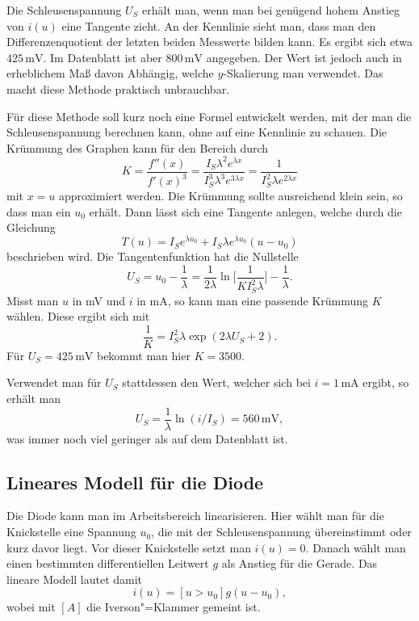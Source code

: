 \documentclass[a4paper,10pt,fleqn,twocolumn,twoside]{scrartcl}
\numberwithin{equation}{section}
\begin{document}
Die Schleusenspannung $U_S$ erhält man,
wenn man bei genügend hohem Anstieg von $i(u)$ eine Tangente
zieht. An der Kennlinie sieht man, dass man den Differenzenquotient
der letzten beiden Messwerte bilden kann. Es ergibt sich etwa
$425\,\mathrm{mV}$. Im Datenblatt ist aber $800\,\mathrm{mV}$
angegeben. Der Wert ist jedoch auch in erheblichem
Maß davon Abhängig, welche $y$-Skalierung man verwendet.
Das macht diese Methode praktisch unbrauchbar.

Für diese Methode soll kurz noch eine Formel entwickelt werden,
mit der man die Schleusenspannung berechnen kann, ohne
auf eine Kennlinie zu schauen. Die Krümmung des Graphen kann für den
Bereich durch%
\begin{equation}
K = \frac{f''(x)}{f'(x)^3}
= \frac{I_S\lambda^2 e^{\lambda x}}{I_S^3\lambda^3 e^{3\lambda x}}
= \frac{1}{I_S^2\lambda e^{2\lambda x}}
\end{equation}
mit $x=u$ approximiert werden. Die Krümmung sollte ausreichend
klein sein, so dass man ein $u_0$ erhält.
Dann lässt sich eine Tangente anlegen, welche
durch die Gleichung%
\begin{equation}
T(u) = I_S e^{\lambda u_0}+I_S \lambda e^{\lambda u_0}(u-u_0)
\end{equation}
beschrieben wird. Die Tangentenfunktion hat die Nullstelle%
\begin{equation}
U_S = u_0-\frac{1}{\lambda} = \frac{1}{2\lambda}
\ln\bigg[\frac{1}{KI_S^2\lambda}\bigg]-\frac{1}{\lambda}.
\end{equation}
Misst man $u$ in mV und $i$ in mA, so kann man eine passende
Krümmung $K$ wählen. Diese ergibt sich mit%
\begin{equation}
\frac{1}{K} = I_S^2\lambda\exp(2\lambda U_S+2).
\end{equation}
Für $U_S=425\,\mathrm{mV}$ bekommt man hier $K=3500$.

Verwendet man für $U_S$ stattdessen den Wert, welcher sich
bei $i=1\,\mathrm{mA}$ ergibt, so erhält man%
\begin{equation}
U_S = \frac{1}{\lambda}\ln(i/I_S) = 560\,\mathrm{mV},
\end{equation}
was immer noch viel geringer als auf dem Datenblatt ist.

\subsection{Lineares Modell für die Diode}
Die Diode kann man im Arbeitsbereich linearisieren.
Hier wählt man für die Knickstelle eine Spannung $u_0$,
die mit der Schleusenspannung übereinstimmt oder kurz davor
liegt. Vor dieser Knickstelle setzt man $i(u)=0$. Danach
wählt man einen bestimmten differentiellen Leitwert $g$
als Anstieg für die Gerade. Das lineare Modell lautet
damit%
\begin{equation}
i(u) = [u>u_0]g(u-u_0),
\end{equation}
wobei mit $[A]$ die Iverson"=Klammer gemeint ist.
\end{document}
